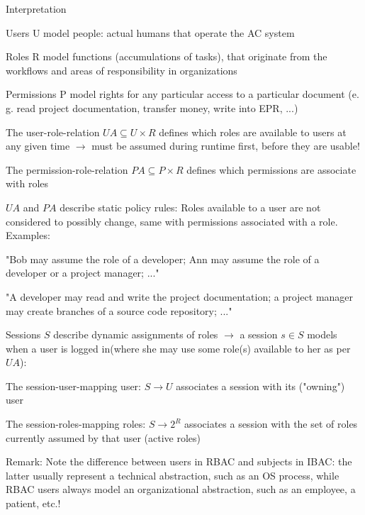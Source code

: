 \documentclass[a4paper]{article}
\begin{document}
\begin{multicols}{3}
    Interpretation
    \begin{itemize*}
        \item Users U model people: actual humans that operate the AC system
        \item Roles R model functions (accumulations of tasks), that originate from the workflows and areas of responsibility in organizations
        \item Permissions P model rights for any particular access to a particular document (e. g. read project documentation, transfer money, write into EPR, ...)
        \item The user-role-relation $UA\subseteq U\times R$ defines which roles are available to users at any given time $\rightarrow$ must be assumed during runtime first, before they are usable!
        \item The permission-role-relation $PA\subseteq P\times R$ defines which permissions are associate with roles
        \item $UA$ and $PA$ describe static policy rules: Roles available to a user are not considered to possibly change, same with permissions associated with a role. Examples:
        \begin{itemize*}
            \item "Bob may assume the role of a developer; Ann may assume the role of a developer or a project manager; ..."
            \item "A developer may read and write the project documentation; a project manager may create branches of a source code repository; ..."
        \end{itemize*}
        \item Sessions $S$ describe dynamic assignments of roles $\rightarrow$ a session $s\in S$ models when a user is logged in(where she may use some role(s) available to her as per $UA$):
        \begin{itemize*}
            \item The session-user-mapping user: $S\rightarrow U$ associates a session with its ("owning") user
            \item The session-roles-mapping roles: $S\rightarrow 2^R$ associates a session with the set of roles currently assumed by that user (active roles)
        \end{itemize*}
    \end{itemize*}


    Remark:
    Note the difference between users in RBAC and subjects in IBAC: the latter usually represent a technical abstraction, such as an OS process, while RBAC users always model an organizational abstraction, such as an employee, a patient, etc.!


\end{multicols}
\end{document}
